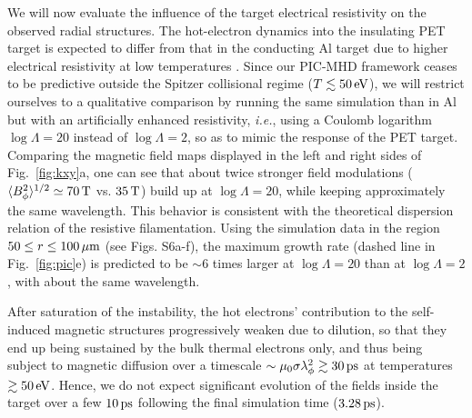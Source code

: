 \documentclass[aps,twocolumn,showpacs,superscriptaddress]{revtex4}
\begin{document}
We will now evaluate the influence of the target electrical resistivity on the observed radial structures. The hot-electron dynamics into the insulating PET target is expected to differ from that in the conducting Al target due to higher electrical resistivity at low temperatures \cite{PRL_Fuchs_2003,PRL_McKenna_2011}. Since our PIC-MHD framework ceases to be predictive outside the Spitzer collisional regime ($T\lesssim 50\,\rm eV$), we will restrict ourselves to a qualitative comparison by running the same simulation than in Al but with an artificially enhanced resistivity, \emph{i.e.}, using a Coulomb logarithm $\log \Lambda = 20$ instead of $\log \Lambda = 2$, so as to mimic the response of the PET target. Comparing the magnetic field maps displayed in the left and right sides of Fig.~\ref{fig:kxy}a, one can see that about twice stronger field modulations ($\langle B_\phi^2 \rangle^{1/2} \simeq 70\,\rm T$ vs. $35\,\rm T$) build up at $\log \Lambda = 20$, while keeping approximately the same wavelength. This behavior is consistent with the theoretical dispersion relation of the resistive filamentation. Using the simulation data in the region $50 \le r \le 100\,\rm \mu m$ (see Figs. S6a-f), the maximum growth rate (dashed line in Fig.~\ref{fig:pic}e) is predicted to be $\sim 6$ times larger at $\log \Lambda = 20$ than at $\log \Lambda = 2$, with about the same wavelength. 

After saturation of the instability, the hot electrons' contribution to the self-induced magnetic structures progressively weaken due to dilution, so that they end up being sustained by the bulk thermal electrons only, and thus being subject to magnetic diffusion over a timescale $\sim \mu_0 \sigma \lambda_\phi^2 \gtrsim 30\,\rm ps$ at temperatures $\gtrsim 50\,\rm eV$. Hence, we do not expect significant evolution of the fields inside the target over a few $10\,\rm ps$ following the final simulation time ($3.28\,\rm ps$).
\end{document}
